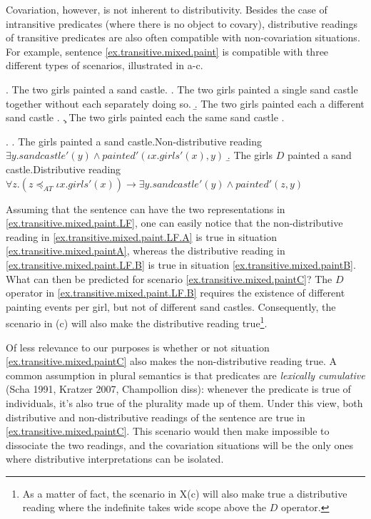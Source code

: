 \documentclass[a4paper, 11pt]{article}
\newcommand{\addMM}[1]{{\leavevmode\color{red}#1}}
\begin{document}
Covariation, however, is not inherent to distributivity. Besides the case of intransitive predicates (where there is no object to covary), distributive readings of transitive predicates are also often compatible with non-covariation situations. 
For example, sentence \ref{ex.transitive.mixed.paint} is compatible with three different types of scenarios, illustrated in a-c. 

\ex. The two girls painted a sand castle. \label{ex.transitive.mixed.paint}
\a. The two girls painted a single sand castle together without each separately doing so. \label{ex.transitive.mixed.paintA}
\b.  The two girls painted each a different sand castle .\label{ex.transitive.mixed.paintB}
\c. The two girls painted each the same sand castle .\label{ex.transitive.mixed.paintC}

\ex. \label{ex.transitive.mixed.paint.LF}
\a. \label{ex.transitive.mixed.paint.LF.A} The girls painted a sand castle.\hfill{Non-distributive reading}\\
        $\exists y.\mathit{sandcastle}'(y) \wedge \textit{painted}'(\iota x.\mathit{girls}'(x), y)$
\b. \label{ex.transitive.mixed.paint.LF.B} The girls $D$ painted a sand castle.\hfill{Distributive reading}\\
    $\forall z . (z\preceq_{AT} \iota x.\mathit{girls}'(x)) \rightarrow \exists y.\mathit{sand castle}'(y) \wedge \textit{painted}'(z,y)$
    

Assuming that the sentence can have the two representations in \ref{ex.transitive.mixed.paint.LF}, one can easily notice that the non-distributive reading in \ref{ex.transitive.mixed.paint.LF.A} is true in  situation \ref{ex.transitive.mixed.paintA}, whereas the distributive reading in \ref{ex.transitive.mixed.paint.LF.B} is true in situation \ref{ex.transitive.mixed.paintB}. What can then be predicted for scenario \ref{ex.transitive.mixed.paintC}? The $D$ operator in \ref{ex.transitive.mixed.paint.LF.B} requires the existence of different painting events per girl, but not of different sand castles. Consequently, the scenario in (c) will also make the distributive reading true\footnote{As a matter of fact, the scenario in X(c) will also make true a distributive reading where the indefinite takes wide scope above the $D$ operator.}. 

Of less relevance to our purposes is whether or not situation \ref{ex.transitive.mixed.paintC} also makes the non-distributive reading true. A common assumption in plural semantics is that predicates are \emph{lexically cumulative} (Scha 1991, Kratzer 2007, Champollion diss): whenever the predicate is true of individuals, it's also true of the plurality made up of them. Under this view, both distributive and non-distributive readings of the sentence are true in  \ref{ex.transitive.mixed.paintC}. \addMM{This scenario would then make impossible to dissociate the two readings, and  the covariation situations will be the only ones where distributive interpretations can be isolated.} 
\end{document}
